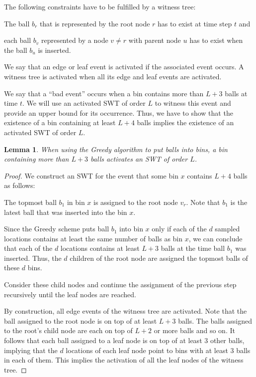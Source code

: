 \documentclass[a4paper,12pt]{article}
\newtheorem{lemma}{Lemma}
\begin{document}
The following constraints have to be fulfilled by a witness tree:
\begin{inparaenum}[(i)]
\item The ball $b_r$ that is represented by the root node $r$ has to exist at time step $t$ and 
\item each ball $b_v$ represented by a node $v \neq r$ with parent node $u$ has to exist when the ball $b_u$ is inserted.
\end{inparaenum}
We say that an edge or leaf event is activated if the associated event occurs. A witness tree is activated when all its edge and leaf events are activated. 

We say that a ``bad event'' occurs when a bin contains more than $L+3$ balls at time $t$. We will use an activated SWT of order $L$ to witness this event and provide an upper bound for its occurrence. Thus, we have to show that the existence of a bin containing at least $L+4$ balls implies the existence of an activated SWT of order $L$. 

\begin{lemma}
When using the Greedy algorithm to put balls into bins, a bin containing more than $L+3$ balls activates an SWT of order $L$.
\end{lemma}

\begin{proof}
We construct an SWT for the event that some bin $x$ contains $L+4$ balls as follows:
\begin{compactenum}
\item The topmost ball $b_1$ in bin $x$ is assigned to the root node $v_r$. Note that $b_1$ is the latest ball that was inserted into the bin $x$.
\item Since the Greedy scheme puts ball $b_1$ into bin $x$ only if each of the $d$ sampled locations contains at least the same number of balls as bin $x$, we can conclude that each of the $d$ locations contains at least $L+3$ balls at the time ball $b_1$ was inserted. Thus, the $d$ children of the root node are assigned the topmost balls of these $d$ bins.
\item Consider these child nodes and continue the assignment of the previous step recursively until the leaf nodes are reached.  
\end{compactenum}

By construction, all edge events of the witness tree are activated. Note that the ball assigned to the root node is on top of at least $L+3$ balls. The balls assigned to the root's child node are each on top of $L+2$ or more balls and so on. It follows that each ball assigned to a leaf node is on top of at least 3 other balls, implying that the $d$ locations of each leaf node point to bins with at least 3 balls in each of them. This implies the activation of all the leaf nodes of the witness tree.
\end{proof}
\end{document}
